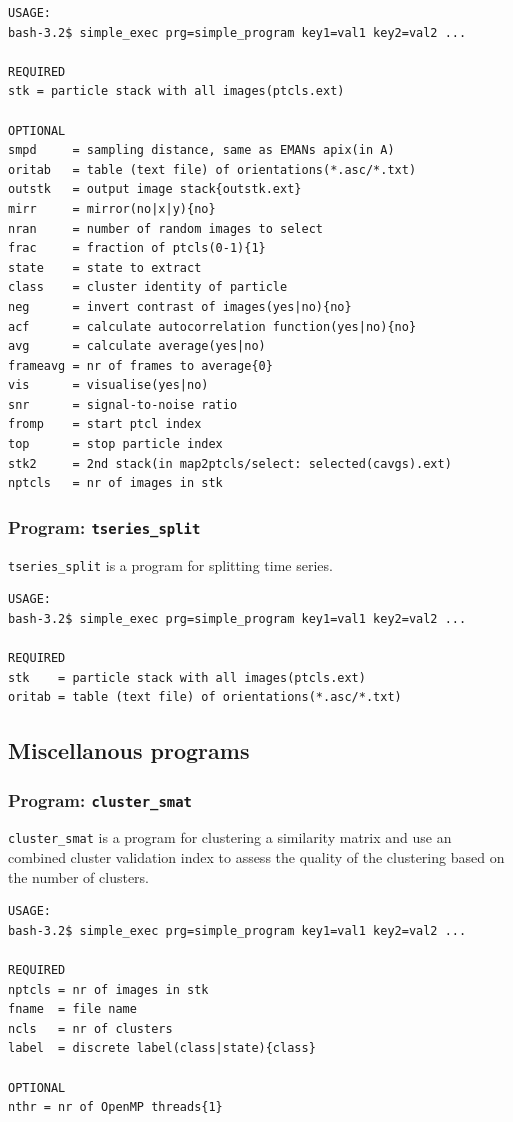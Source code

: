 \documentclass[a4paper,11pt]{article}
\newcommand{\prgname}[1]{\textcolor{NavyBlue}{\texttt{#1}}}
\begin{document}
\begin{verbatim}
USAGE:
bash-3.2$ simple_exec prg=simple_program key1=val1 key2=val2 ...

REQUIRED
stk = particle stack with all images(ptcls.ext)

OPTIONAL
smpd     = sampling distance, same as EMANs apix(in A)
oritab   = table (text file) of orientations(*.asc/*.txt)
outstk   = output image stack{outstk.ext}
mirr     = mirror(no|x|y){no}
nran     = number of random images to select
frac     = fraction of ptcls(0-1){1}
state    = state to extract
class    = cluster identity of particle
neg      = invert contrast of images(yes|no){no}
acf      = calculate autocorrelation function(yes|no){no}
avg      = calculate average(yes|no)
frameavg = nr of frames to average{0}
vis      = visualise(yes|no)
snr      = signal-to-noise ratio
fromp    = start ptcl index
top      = stop particle index
stk2     = 2nd stack(in map2ptcls/select: selected(cavgs).ext)
nptcls   = nr of images in stk
\end{verbatim}

\subsubsection{Program: \prgname{tseries\_split}}
\label{tseries_split}
\prgname{tseries\_split} is a program for splitting time series.

\begin{verbatim}
USAGE:
bash-3.2$ simple_exec prg=simple_program key1=val1 key2=val2 ...

REQUIRED
stk    = particle stack with all images(ptcls.ext)
oritab = table (text file) of orientations(*.asc/*.txt)
\end{verbatim}

\subsection{Miscellanous programs}

\subsubsection{Program: \prgname{cluster\_smat}}
\label{cluster_smat}
\prgname{cluster\_smat} is a program for clustering a similarity matrix and use an combined cluster validation index to assess the quality of the clustering based on the number of clusters.

\begin{verbatim}
USAGE:
bash-3.2$ simple_exec prg=simple_program key1=val1 key2=val2 ...

REQUIRED
nptcls = nr of images in stk
fname  = file name
ncls   = nr of clusters
label  = discrete label(class|state){class}

OPTIONAL
nthr = nr of OpenMP threads{1}
\end{verbatim}
\end{document}
